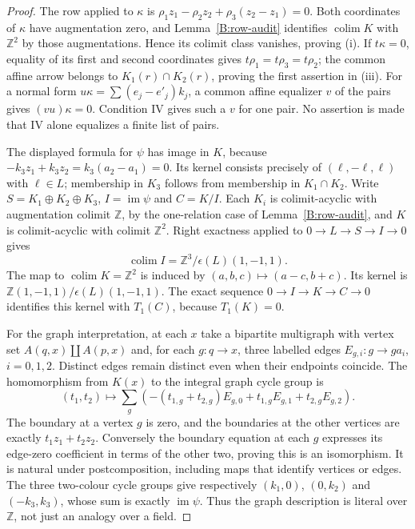 \begin{proof}
The row applied to $\kappa$ is
$\rho_1z_1-\rho_2z_2+\rho_3(z_2-z_1)=0$.
Both coordinates of $\kappa$ have augmentation zero, and
Lemma~\ref{B:row-audit} identifies $\operatorname{colim}K$ with
$\mathbb Z^2$ by those augmentations.  Hence its colimit class
vanishes, proving (i).
If $t\kappa=0$, equality of its first and second coordinates gives
$t\rho_1=t\rho_3=t\rho_2$; the common affine arrow belongs to
$K_1(r)\cap K_2(r)$, proving the first assertion in (iii).
For a normal form $u\kappa=\sum(e_j-e'_j)k_j$, a common affine
equalizer $v$ of the pairs gives $(vu)\kappa=0$.  Condition IV gives
such a $v$ for one pair.  No assertion is made that IV alone
equalizes a finite list of pairs.

The displayed formula for $\psi$ has image in $K$, because
$-k_3z_1+k_3z_2=k_3(a_2-a_1)=0$.  Its kernel consists precisely of
$(\ell,-\ell,\ell)$ with $\ell\in L$; membership in $K_3$
follows from membership in $K_1\cap K_2$.  Write
$S=K_1\oplus K_2\oplus K_3$, $I=\operatorname{im}\psi$ and
$C=K/I$.  Each $K_i$ is colimit-acyclic with augmentation colimit
$\mathbb Z$, by the one-relation case of
Lemma~\ref{B:row-audit}, and $K$ is colimit-acyclic with colimit
$\mathbb Z^2$.  Right exactness applied to $0\to L\to S\to I\to0$
gives
\[
 \operatorname{colim}I
 =\mathbb Z^3/\epsilon(L)(1,-1,1).
\]
The map to $\operatorname{colim}K=\mathbb Z^2$ is induced by
$(a,b,c)\mapsto(a-c,b+c)$.  Its kernel is
$\mathbb Z(1,-1,1)/\epsilon(L)(1,-1,1)$.
The exact sequence $0\to I\to K\to C\to0$ identifies this
kernel with $T_1(C)$, because $T_1(K)=0$.

For the graph interpretation, at each $x$ take a bipartite multigraph
with vertex set $A(q,x)\amalg A(p,x)$ and, for each $g:q\to x$,
three labelled edges $E_{g,i}:g\to ga_i$, $i=0,1,2$.
Distinct edges remain distinct even when their endpoints coincide.
The homomorphism from $K(x)$ to the integral graph cycle group is
\[
 (t_1,t_2)\longmapsto
 \sum_g\left(-(t_{1,g}+t_{2,g})E_{g,0}
             +t_{1,g}E_{g,1}+t_{2,g}E_{g,2}\right).
\]
The boundary at a vertex $g$ is zero, and the boundaries at the
other vertices are exactly $t_1z_1+t_2z_2$.  Conversely the boundary
equation at each $g$ expresses its edge-zero coefficient in terms of
the other two, proving this is an isomorphism.  It is natural under
postcomposition, including maps that identify vertices or edges.
The three two-colour cycle groups give respectively
$(k_1,0)$, $(0,k_2)$ and $(-k_3,k_3)$, whose sum is exactly
$\operatorname{im}\psi$.  Thus the graph description is literal over
$\mathbb Z$, not just an analogy over a field.
\end{proof}

